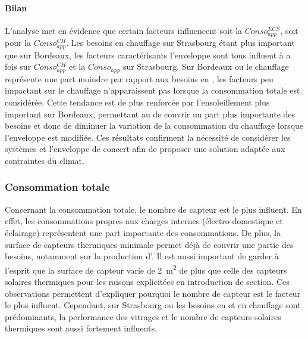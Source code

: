 \paragraph{Bilan} %
\label{par:bilan_conso_app}
L’analyse met en évidence que certain facteurs influencent soit la $Conso_{app}^{ECS}$,
soit pour la $Conso_{app}^{CH}$. Les besoins en chauffage sur Strasbourg étant plus
important que sur Bordeaux, les facteurs caractérisants l’enveloppe sont tous influent à a
fois sur $Conso_{app}^{CH}$ et la $Conso_{app}$ sur Strasbourg. Sur Bordeaux ou le
chauffage représente une part moindre par rapport aux besoins en , les facteurs
peu impactant sur le chauffage n’apparaissent pas lorsque la consommation totale est
considérée. Cette tendance est de plus renforcée par l’ensoleillement plus important sur
Bordeaux, permettant au
 de couvrir un part plus importante des besoins et donc de diminuer
la variation de la consommation du chauffage lorsque l’enveloppe est modifiée. Ces
résultats confirment la nécessité de considérer les systèmes et l’enveloppe de concert
afin de proposer une solution adaptée aux contraintes du climat.


\subsubsection{Consommation totale} %
\label{ssub:consommation_totale}
Concernant la consommation totale, le nombre de capteur  est le plus influent.
En effet, les consommations propres aux charges internes (électro-domestique et éclairage)
représentent une part importante des consommations. De plus, la surface de capteurs
thermiques minimale permet déjà de couvrir une partie des besoins, notamment sur la
production d’. Il est aussi important de garder à l’esprit que la surface de
capteur  varie de \SI{2}{\metre\squared} de plus que celle des capteurs solaires
thermiques pour les raisons explicitées en introduction de section. Ces observations permettent
d’expliquer pourquoi le nombre de capteur  est le facteur le plus influent.
Cependant, sur Strasbourg ou les besoins en  et en chauffage sont prédominants,
la performance des vitrages et le nombre de capteurs solaires thermiques sont aussi
fortement influents.


